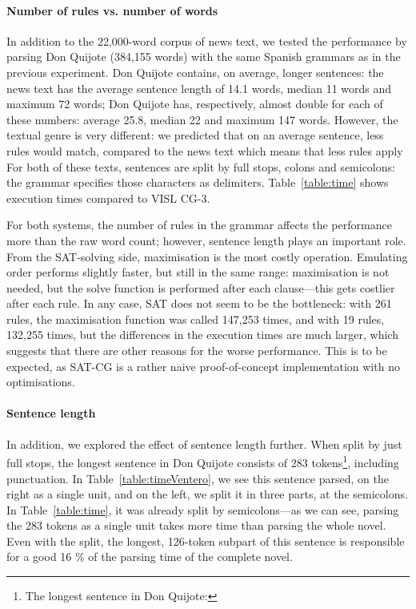 \paragraph{Number of rules vs. number of words}

In addition to the 22,000-word corpus of news text,
we tested the performance by parsing Don Quijote (384,155 words) with
the same Spanish grammars as in the previous experiment. 
Don Quijote contains, on average, longer sentences: the news text has the average sentence length of 14.1 words, median 11 words and maximum 72 words; Don Quijote has, respectively, almost double for each of these numbers: average 25.8, median 22 and maximum 147 words.
However, the textual genre is very different: we predicted that on an average sentence,
less rules would match, compared to the news text
 which means that less rules apply
For both of these texts, sentences are split by full stops, colons and semicolons: the grammar specifies those characters as delimiters.
Table~\ref{table:time} shows execution times compared to VISL CG-3.


For both systems, the number of rules in the grammar affects the performance 
more than the raw word count; however, sentence length plays an important role.
From the SAT-solving side, maximisation is the most costly operation. 
Emulating order performs slightly faster, but still in the same range: 
maximisation is not needed, but the solve function is performed after each clause---this
gets costlier after each rule.
In any case, SAT does not seem to be the bottleneck: with 261 rules,
the maximisation function was called 147,253 times, and with 19 rules,
132,255 times, but 
the differences in the execution times are much larger, which suggests
that there are other reasons for the worse performance. 
This is to be expected, as SAT-CG is a rather naive
proof-of-concept implementation with no optimisations.

\paragraph{Sentence length} 
In addition, we explored the effect of sentence length further.
When split by just full stops, the longest sentence in Don Quijote consists of 283 tokens\footnote{The longest sentence in Don Quijote: \ventero}, including punctuation. In Table~\ref{table:timeVentero}, we see this sentence parsed, on the right as a single unit, and on the left, we split it in three parts, at the semicolons. In Table~\ref{table:time}, it was already split by semicolons---as we can see, parsing the 283 tokens as a single unit takes more time than parsing the whole novel.
Even with the split, the longest, 126-token subpart of this sentence is responsible for a good 16 \% of the parsing time of the complete novel. 


